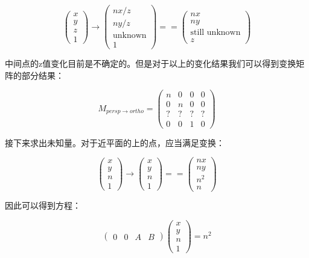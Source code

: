 \documentclass[openany]{progbookcn}
\begin{document}
\begin{equation}
	\begin{pmatrix}x\\y\\z\\1\end{pmatrix}\rightarrow\begin{pmatrix}nx/z\\ny/z\\\text{unknown}\\1\end{pmatrix}==\begin{pmatrix}nx\\ny\\\text{still unknown}\\z\end{pmatrix}
\end{equation}

中间点的z值变化目前是不确定的。但是对于以上的变化结果我们可以得到变换矩阵的部分结果：

\begin{equation}
	M_{persp\rightarrow ortho}=\begin{pmatrix}n&0&0&0\\0&n&0&0\\?&?&?&?\\0&0&1&0\end{pmatrix}
\end{equation}

接下来求出未知量。对于近平面的上的点，应当满足变换：

\begin{equation}
	\begin{pmatrix}x\\y\\n\\1\end{pmatrix}\rightarrow\begin{pmatrix}x\\y\\n\\1\end{pmatrix}==\begin{pmatrix}nx\\ny\\n^2\\n\end{pmatrix}
\end{equation}

因此可以得到方程：

\begin{equation}
	\begin{pmatrix}0&0&A&B\end{pmatrix}\begin{pmatrix}x\\y\\n\\1\end{pmatrix}=n^2
\end{equation}
\end{document}
